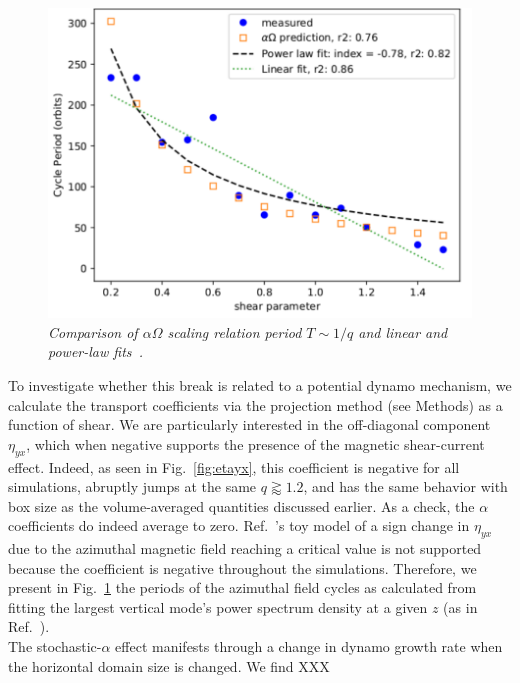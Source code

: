 \documentclass{epsconf}
\begin{document}
%
\begin{figure}
\begin{center} \vspace{0cm}
\includegraphics[width=\linewidth]{fig_q_cycle_period_hgbLAIF_r64z4b4000znf.pdf}
\caption{\it \small Comparison of $\alpha\Omega$ scaling relation period $T\sim 1/q$ and linear and power-law fits~\cite{GP15}.}
\label{fig:qperiod}
\vspace{0cm}
\end{center}
\end{figure}%
To investigate whether this break is related to a potential dynamo mechanism, we calculate the transport coefficients via the projection method (see Methods) as a function of shear. We are particularly interested in the off-diagonal component $\eta_{yx}$, which when negative supports the presence of the magnetic shear-current effect. Indeed, as seen in Fig.~\ref{fig:etayx}, this coefficient is negative for all simulations, abruptly jumps at the same $q\gtrapprox1.2$, and has the same behavior with box size as the volume-averaged quantities discussed earlier. As a check, the $\alpha$ coefficients do indeed average to zero. Ref.~\cite{LesurOgilvie08}'s toy model of a sign change in $\eta_{yx}$ due to the azimuthal magnetic field reaching a critical value is not supported because the coefficient is negative throughout the simulations. Therefore, we present in Fig.~\ref{fig:qperiod} the periods of the azimuthal field cycles as calculated from fitting the largest vertical mode's power spectrum density at a given $z$ (as in Ref.~\cite{SSH16}).  \\
%
The stochastic-$\alpha$ effect manifests through a change in dynamo growth rate when the horizontal domain size is changed. We find XXX
\end{document}
